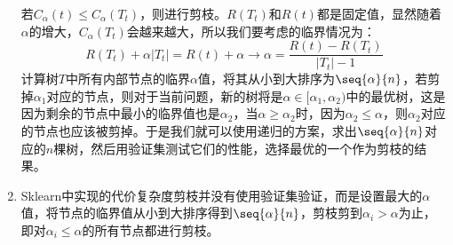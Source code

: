 \begin{enumerate}
	若$C_\alpha(t)\leqslant C_\alpha(T_t)$，则进行剪枝。$R(T_t)$和$R(t)$都是固定值，显然随着$\alpha$的增大，$C_\alpha(T_t)$会越来越大，所以我们要考虑的临界情况为：
	\begin{equation*}
		R(T_t)+\alpha|T_t|=R(t)+\alpha\longrightarrow\alpha=\frac{R(t)-R(T_t)}{|T_t|-1}
	\end{equation*}
	计算树$T$中所有内部节点的临界$\alpha$值，将其从小到大排序为$\seq{\alpha}{n}$，若剪掉$\alpha_1$对应的节点，则对于当前问题，新的树将是$\alpha\in[\alpha_1,\alpha_2)$中的最优树，这是因为剩余的节点中最小的临界值也是$\alpha_2$，当$\alpha\geqslant\alpha_2$时，因为$\alpha_2\leqslant\alpha$，则$\alpha_2$对应的节点也应该被剪掉。于是我们就可以使用递归的方案，求出$\seq{\alpha}{n}$对应的$n$棵树，然后用验证集测试它们的性能，选择最优的一个作为剪枝的结果。
	\item Sklearn中实现的代价复杂度剪枝并没有使用验证集验证，而是设置最大的$\alpha$值，将节点的临界值从小到大排序得到$\seq{\alpha}{n}$，剪枝剪到$\alpha_i>\alpha$为止，即对$\alpha_i\leqslant\alpha$的所有节点都进行剪枝。
\end{enumerate}

